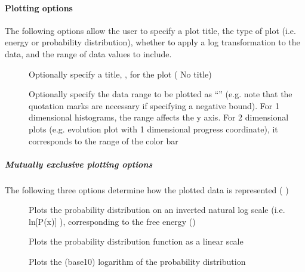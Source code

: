 \documentclass[letterpaper,10pt,english]{sphinxmanual}
\begin{document}
\paragraph{Plotting options}
\label{\detokenize{users_guide/command_line_tools/plothist:plotting-options}}
The following options allow the user to specify a plot title, the type
of plot (i.e. energy or probability distribution), whether to apply a
log transformation to the data, and the range of data values to include.
\begin{description}
\item[{}] \leavevmode
Optionally specify a title, , for the plot (
No title)

\item[{}] \leavevmode
Optionally specify the data range to be plotted as “”
(e.g.  \sphinxhyphen{} note that the quotation marks are
necessary if specifying a negative bound). For 1 dimensional
histograms, the range affects the y axis. For 2 dimensional plots
(e.g. evolution plot with 1 dimensional progress coordinate), it
corresponds to the range of the color bar

\end{description}


\subparagraph{Mutually exclusive plotting options}
\label{\detokenize{users_guide/command_line_tools/plothist:mutually-exclusive-plotting-options}}
The following three options determine how the plotted data is
represented ( )
\begin{description}
\item[{}] \leavevmode
Plots the probability distribution on an inverted natural log scale
(i.e. \sphinxhyphen{}ln{[}P(x){]} ), corresponding to the free energy ()

\item[{}] \leavevmode
Plots the probability distribution function as a linear scale

\item[{}] \leavevmode
Plots the (base\sphinxhyphen{}10) logarithm of the probability distribution

\end{description}
\end{document}
